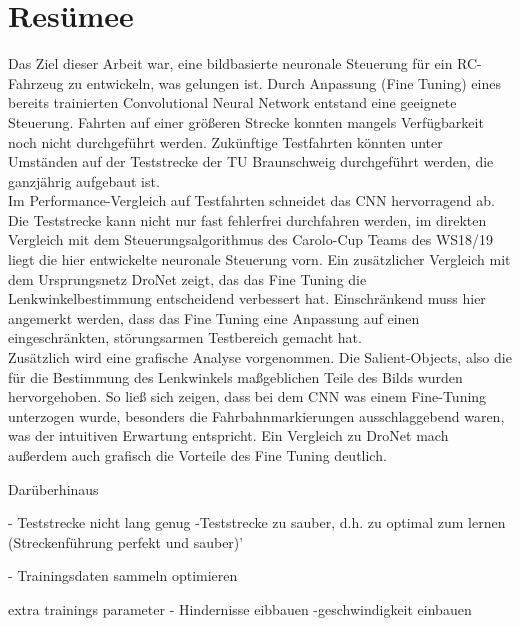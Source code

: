 %
\chapter{Resümee}

Das Ziel dieser Arbeit war, eine bildbasierte neuronale Steuerung für ein RC-Fahrzeug zu entwickeln, was gelungen ist. Durch Anpassung (Fine Tuning) eines bereits trainierten Convolutional Neural Network entstand eine geeignete Steuerung. Fahrten auf einer größeren Strecke konnten mangels Verfügbarkeit noch nicht durchgeführt werden. Zukünftige Testfahrten könnten unter Umständen auf der Teststrecke der TU Braunschweig durchgeführt werden, die ganzjährig aufgebaut ist.\\
Im Performance-Vergleich auf Testfahrten schneidet das CNN hervorragend ab. Die Teststrecke kann nicht nur fast fehlerfrei durchfahren werden, im direkten Vergleich mit dem Steuerungsalgorithmus des Carolo-Cup Teams des WS18/19 liegt die hier entwickelte neuronale Steuerung vorn. Ein zusätzlicher Vergleich mit dem Ursprungsnetz DroNet zeigt, das das Fine Tuning die Lenkwinkelbestimmung entscheidend verbessert hat. Einschränkend muss hier angemerkt werden, dass das Fine Tuning eine Anpassung auf einen eingeschränkten, störungsarmen Testbereich gemacht hat.\\
Zusätzlich wird eine grafische Analyse vorgenommen. Die Salient-Objects, also die für die Bestimmung des Lenkwinkels maßgeblichen Teile des Bilds wurden hervorgehoben. So ließ sich zeigen, dass bei dem CNN was einem Fine-Tuning unterzogen wurde, besonders die Fahrbahnmarkierungen ausschlaggebend waren, was der intuitiven Erwartung entspricht. Ein Vergleich zu DroNet mach außerdem auch grafisch die Vorteile des Fine Tuning deutlich. 

Darüberhinaus






- Teststrecke nicht lang genug 
-Teststrecke zu sauber, d.h. zu optimal zum lernen (Streckenführung perfekt und sauber)'

- Trainingsdaten sammeln optimieren

extra trainings parameter
- Hindernisse eibbauen
-geschwindigkeit einbauen